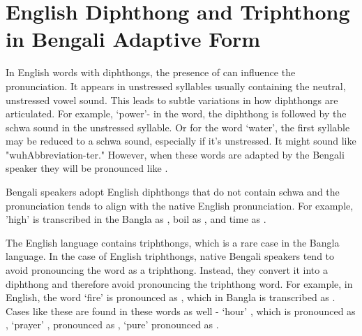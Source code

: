 \begin{table}[!ht]
    \centering
    \caption{Phonetic Transcription of borrowed foreign words}
\end{table}

\section{English Diphthong and Triphthong in Bengali Adaptive Form}

In English words with diphthongs, the presence of  can influence the pronunciation. It appears in unstressed syllables usually containing the neutral, unstressed vowel sound. 
This leads to subtle variations in how diphthongs are articulated. For example, ‘power’- in the word, the diphthong  is followed by the schwa sound in the unstressed syllable. Or for the word ‘water’, the first syllable may be reduced to a schwa sound, especially if it's unstressed. It might sound like "wuhAbbreviation-ter." However, when these words are adapted by the Bengali speaker they will be pronounced like  . 

\vspace{5mm}

Bengali speakers adopt English diphthongs that do not contain schwa and the pronunciation tends to align with the native English pronunciation. For example, 'high’ is transcribed in the Bangla as , boil as , and time as . 

\vspace{5mm}

The English language contains triphthongs, which is a rare case in the Bangla language. In the case of English triphthongs, native Bengali speakers tend to avoid pronouncing the word as a triphthong. Instead, they convert it into a diphthong and therefore avoid pronouncing the triphthong word. For example, in English, the word ‘fire’ is pronounced as , which in Bangla is transcribed as . Cases like these are found in these words as well - ‘hour’ , which is pronounced as , ‘prayer’ , pronounced as , ‘pure’  pronounced as . 

